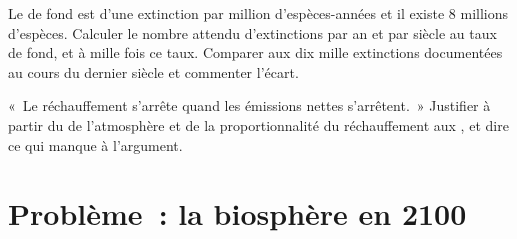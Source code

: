 \begin{exercise}[$\star\star\star$]\label{exo:b2:global-change:11}
Le  de fond est d'une extinction par million
d'espèces-années et il existe 8 millions d'espèces. Calculer le nombre
attendu d'extinctions par an et par siècle au taux de fond, et à mille
fois ce taux. Comparer aux dix mille extinctions documentées au cours du
dernier siècle et commenter l'écart.
\end{exercise}

\begin{exercise}[$\star\star\star$]\label{exo:b2:global-change:12}
«~Le réchauffement s'arrête quand les émissions nettes s'arrêtent.~»
Justifier à partir du  de l'atmosphère et de la
proportionnalité du réchauffement aux , et dire ce qui
manque à l'argument.
\end{exercise}

\section{Problème~: la biosphère en 2100}


